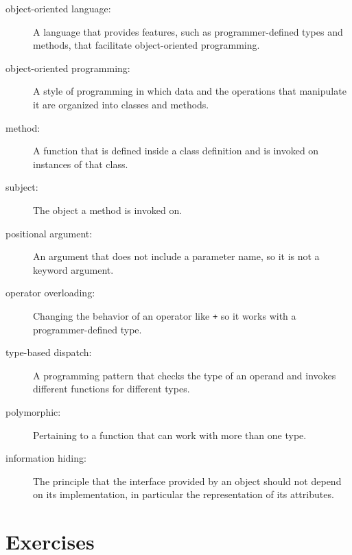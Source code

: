\begin{description}

\item[object-oriented language:] A language that provides features,
  such as programmer-defined types and methods, that facilitate
  object-oriented programming.

\item[object-oriented programming:] A style of programming in which
data and the operations that manipulate it are organized into classes
and methods.

\item[method:] A function that is defined inside a class definition and
is invoked on instances of that class.

\item[subject:] The object a method is invoked on.

\item[positional argument:]  An argument that does not include
a parameter name, so it is not a keyword argument.

\item[operator overloading:] Changing the behavior of an operator like
{\tt +} so it works with a programmer-defined type.

\item[type-based dispatch:] A programming pattern that checks the type
of an operand and invokes different functions for different types.

\item[polymorphic:] Pertaining to a function that can work with more
  than one type.

\item[information hiding:] The principle that the interface provided
by an object should not depend on its implementation, in particular
the representation of its attributes.

\end{description}


\section{Exercises}

